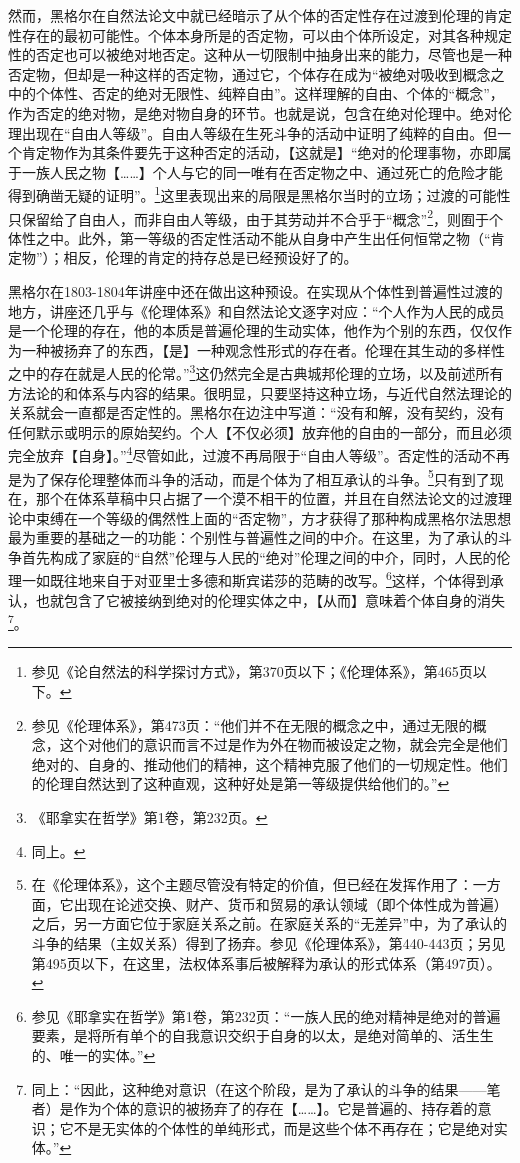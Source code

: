 然而，黑格尔在自然法论文中就已经暗示了从个体的否定性存在过渡到伦理的肯定性存在的最初可能性。个体本身所是的否定物，可以由个体所设定，对其各种规定性的否定也可以被绝对地否定。这种从一切限制中抽身出来的能力，尽管也是一种否定物，但却是一种这样的否定物，通过它，个体存在成为“被绝对吸收到概念之中的个体性、否定的绝对无限性、纯粹自由”。这样理解的自由、个体的“概念”，作为否定的绝对物，是绝对物自身的环节。也就是说，包含在绝对伦理中。绝对伦理出现在“自由人等级”。自由人等级在生死斗争的活动中证明了纯粹的自由。但一个肯定物作为其条件要先于这种否定的活动，【这就是】“绝对的伦理事物，亦即属于一族人民之物【……】个人与它的同一唯有在否定物之中、通过死亡的危险才能得到确凿无疑的证明”。\footnote{参见《论自然法的科学探讨方式》，第370页以下；《伦理体系》，第465页以下。}这里表现出来的局限是黑格尔当时的立场；过渡的可能性只保留给了自由人，而非自由人等级，由于其劳动并不合乎于“概念”\footnote{参见《伦理体系》，第473页：“他们并不在无限的概念之中，通过无限的概念，这个对他们的意识而言不过是作为外在物而被设定之物，就会完全是他们绝对的、自身的、推动他们的精神，这个精神克服了他们的一切规定性。他们的伦理自然达到了这种直观，这种好处是第一等级提供给他们的。”}，则囿于个体性之中。此外，第一等级的否定性活动不能从自身中产生出任何恒常之物（“肯定物”）；相反，伦理的肯定的持存总是已经预设好了的。

黑格尔在1803-1804年讲座中还在做出这种预设。在实现从个体性到普遍性过渡的地方，讲座还几乎与《伦理体系》和自然法论文逐字对应：“个人作为人民的成员是一个伦理的存在，他的本质是普遍伦理的生动实体，他作为个别的东西，仅仅作为一种被扬弃了的东西，【是】一种观念性形式的存在者。伦理在其生动的多样性之中的存在就是人民的伦常。”\footnote{《耶拿实在哲学》第1卷，第232页。}这仍然完全是古典城邦伦理的立场，以及前述所有方法论的和体系与内容的结果。很明显，只要坚持这种立场，与近代自然法理论的关系就会一直都是否定性的。黑格尔在边注中写道：“没有和解，没有契约，没有任何默示或明示的原始契约。个人【不仅必须】放弃他的自由的一部分，而且必须完全放弃【自身】。”\footnote{同上。}尽管如此，过渡不再局限于“自由人等级”。否定性的活动不再是为了保存伦理整体而斗争的活动，而是个体为了相互承认的斗争。\footnote{在《伦理体系》，这个主题尽管没有特定的价值，但已经在发挥作用了：一方面，它出现在论述交换、财产、货币和贸易的承认领域（即个体性成为普遍）之后，另一方面它位于家庭关系之前。在家庭关系的“无差异”中，为了承认的斗争的结果（主奴关系）得到了扬弃。参见《伦理体系》，第440-443页；另见第495页以下，在这里，法权体系事后被解释为承认的形式体系（第497页）。}只有到了现在，那个在体系草稿中只占据了一个漠不相干的位置，并且在自然法论文的过渡理论中束缚在一个等级的偶然性上面的“否定物”，方才获得了那种构成黑格尔法思想最为重要的基础之一的功能：个别性与普遍性之间的中介。在这里，为了承认的斗争首先构成了家庭的“自然”伦理与人民的“绝对”伦理之间的中介，同时，人民的伦理一如既往地来自于对亚里士多德和斯宾诺莎的范畴的改写。\footnote{参见《耶拿实在哲学》第1卷，第232页：“一族人民的绝对精神是绝对的普遍要素，是将所有单个的自我意识交织于自身的以太，是绝对简单的、活生生的、唯一的实体。”}这样，个体得到承认，也就包含了它被接纳到绝对的伦理实体之中，【从而】意味着个体自身的消失\footnote{同上：“因此，这种绝对意识（在这个阶段，是为了承认的斗争的结果——笔者）是作为个体的意识的被扬弃了的存在【……】。它是普遍的、持存着的意识；它不是无实体的个体性的单纯形式，而是这些个体不再存在；它是绝对实体。”}。

